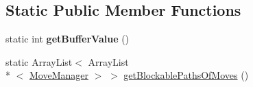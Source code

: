 \subsection*{Static Public Member Functions}
\begin{DoxyCompactItemize}
\item 
\hypertarget{enumenums_1_1_level_two_legal_moves_a2714fce0d816797101aa88ab0b979a85}{static int {\bfseries get\-Buffer\-Value} ()}\label{enumenums_1_1_level_two_legal_moves_a2714fce0d816797101aa88ab0b979a85}

\item 
static Array\-List$<$ Array\-List\\*
$<$ \hyperlink{interfaceinterfaces_1_1_move_manager}{Move\-Manager} $>$ $>$ \hyperlink{enumenums_1_1_level_two_legal_moves_af7cfa8687891cb281fa553bff37071b9}{get\-Blockable\-Paths\-Of\-Moves} ()
\end{DoxyCompactItemize}
